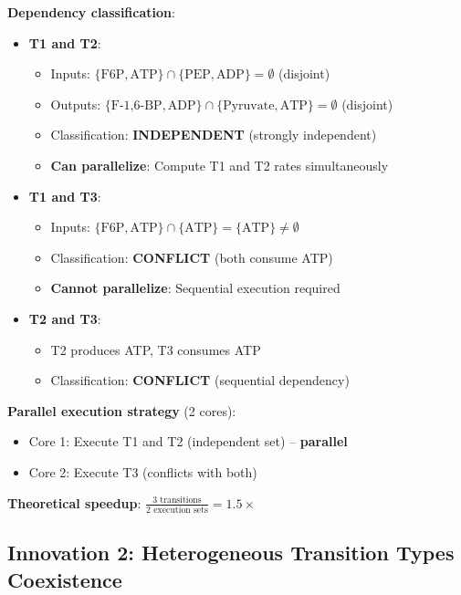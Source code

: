 \textbf{Dependency classification}:

\begin{itemize}
    \item \textbf{T1 and T2}:
    \begin{itemize}
        \item Inputs: $\{\text{F6P}, \text{ATP}\} \cap \{\text{PEP}, \text{ADP}\} = \emptyset$ (disjoint)
        \item Outputs: $\{\text{F-1,6-BP}, \text{ADP}\} \cap \{\text{Pyruvate}, \text{ATP}\} = \emptyset$ (disjoint)
        \item Classification: \textbf{INDEPENDENT} (strongly independent)
        \item \textbf{Can parallelize}: Compute T1 and T2 rates simultaneously
    \end{itemize}
    
    \item \textbf{T1 and T3}:
    \begin{itemize}
        \item Inputs: $\{\text{F6P}, \text{ATP}\} \cap \{\text{ATP}\} = \{\text{ATP}\} \neq \emptyset$
        \item Classification: \textbf{CONFLICT} (both consume ATP)
        \item \textbf{Cannot parallelize}: Sequential execution required
    \end{itemize}
    
    \item \textbf{T2 and T3}:
    \begin{itemize}
        \item T2 produces ATP, T3 consumes ATP
        \item Classification: \textbf{CONFLICT} (sequential dependency)
    \end{itemize}
\end{itemize}

\textbf{Parallel execution strategy} (2 cores):

\begin{itemize}
    \item Core 1: Execute T1 and T2 (independent set) -- \textbf{parallel}
    \item Core 2: Execute T3 (conflicts with both)
\end{itemize}

\textbf{Theoretical speedup}: $\frac{3 \text{ transitions}}{2 \text{ execution sets}} = 1.5\times$

\subsection{Innovation 2: Heterogeneous Transition Types Coexistence}
\label{subsec:energy-heterogeneous}

